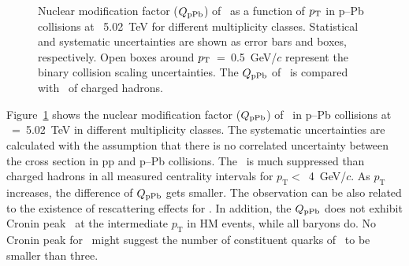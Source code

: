 \begin{figure}[!hbt]
	\centering
	\caption{ Nuclear modification factor ($Q_{\rm{pPb}}$) of \fzero~as a function of $p_{\rm{T}}$ in p--Pb collisions at \snn~5.02~TeV for different multiplicity classes. Statistical and systematic uncertainties are shown as error bars and boxes, respectively. Open boxes around $p_{\rm{T}}$~=~0.5~GeV/$c$ represent the binary collision scaling uncertainties. The $Q_{\rm{pPb}}$ of \fzero~is compared with \fzero~of charged hadrons. }
	\label{fig:QpPb}
\end{figure}

Figure~\ref{fig:QpPb} shows the nuclear modification factor ($Q_{\rm{pPb}}$) of \fzero~in p--Pb collisions at \snn~=~5.02~TeV in different multiplicity classes. The systematic uncertainties are calculated with the assumption that there is no correlated uncertainty between the cross section in pp and p--Pb collisions. The \fzero~is much suppressed than charged hadrons in all measured centrality intervals for $p_{\mathrm{T}}<$~4~GeV/$c$. As $p_{\mathrm{T}}$ increases, the difference of $Q_{\rm{pPb}}$ gets smaller. The observation can be also related to the existence of rescattering effects for \fzero. In addition, the $Q_{\rm{pPb}}$ does not exhibit Cronin peak~\cite{Cronin:1974zm} at the intermediate $p_{\mathrm{T}}$ in HM events, while all baryons do. No Cronin peak for \fzero~might suggest the number of constituent quarks of \fzero~to be smaller than three.